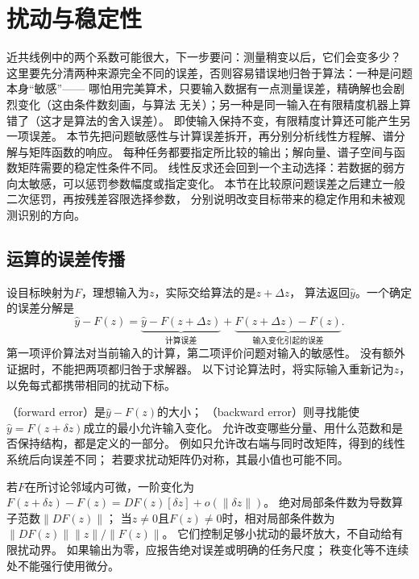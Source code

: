 \section{扰动与稳定性}
\label{sec:linear-algebra-stability}
\label{sec:matrix-analysis-conditioning-perturbation}


近共线例中的两个系数可能很大，下一步要问：测量稍变以后，它们会变多少？
这里要先分清两种来源完全不同的误差，否则容易错误地归咎于算法：一种是问题本身“敏感”——
哪怕用完美算术，只要输入数据有一点测量误差，精确解也会剧烈变化（这由条件数刻画，与算法
无关）；另一种是同一输入在有限精度机器上算错了（这才是算法的舍入误差）。
即使输入保持不变，有限精度计算还可能产生另一项误差。
本节先把问题敏感性与计算误差拆开，再分别分析线性方程解、谱分解与矩阵函数的响应。
每种任务都要指定所比较的输出；解向量、谱子空间与函数矩阵需要的稳定性条件不同。
线性反求还会回到一个主动选择：若数据的弱方向太敏感，可以惩罚参数幅度或指定变化。
本节在比较原问题误差之后建立一般二次惩罚，再按残差容限选择参数，
分别说明改变目标带来的稳定作用和未被观测识别的方向。

\subsection{运算的误差传播}
\label{sec:linear-algebra-error-propagation}
\label{sec:ch06-error-propagation}


设目标映射为$F$，理想输入为$z$，实际交给算法的是$z+\Delta z$，
算法返回$\widehat y$。一个确定的误差分解是
\[
 \widehat y-F(z)
 =\underbrace{\widehat y-F(z+\Delta z)}_{\text{计算误差}}
  +\underbrace{F(z+\Delta z)-F(z)}_{\text{输入变化引起的误差}}.
\]
第一项评价算法对当前输入的计算，第二项评价问题对输入的敏感性。
没有额外证据时，不能把两项都归咎于求解器。
以下讨论算法时，将实际输入重新记为$z$，以免每式都携带相同的扰动下标。

（forward error）是$\widehat y-F(z)$的大小；
（backward error）则寻找能使
$\widehat y=F(z+\delta z)$成立的最小允许输入变化。
允许改变哪些分量、用什么范数和是否保持结构，都是定义的一部分。
例如只允许改右端与同时改矩阵，得到的线性系统后向误差不同；
若要求扰动矩阵仍对称，其最小值也可能不同。

若$F$在所讨论邻域内可微，一阶变化为
$F(z+\delta z)-F(z)=DF(z)[\delta z]+o(\lVert\delta z\rVert)$。
绝对局部条件数为导数算子范数$\lVert DF(z)\rVert$；
当$z\neq0$且$F(z)\neq0$时，相对局部条件数为
$\lVert DF(z)\rVert\lVert z\rVert/\lVert F(z)\rVert$。
它们控制足够小扰动的最坏放大，不自动给有限扰动界。
如果输出为零，应报告绝对误差或明确的任务尺度；
秩变化等不连续处不能强行使用微分。

